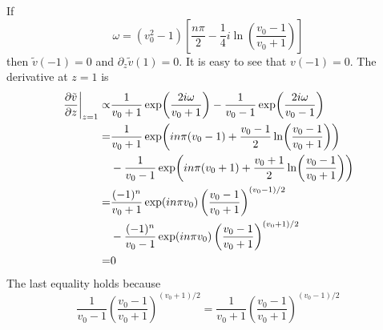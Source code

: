If
\[\omega = (v_0^2-1) \left[ \frac{n\pi}{2} - \frac{1}{4}i\ln\left(\frac{v_0-1}{v_0+1}\right) \right]\]
then $\tilde{v}(-1) = 0$ and $\partial_z\tilde{v}(1) = 0$.
It is easy to see that $v(-1)=0$. The derivative at $z=1$ is
\begin{align*}
    \eval{\pdv{\tilde{v}}{z}}_{z=1} \propto &
    \frac{1}{v_0+1}\exp(\frac{2i\omega}{v_0+1}) - \frac{1}{v_0-1}\exp(\frac{2i\omega}{v_0-1})                                   \\
    =                                       & \frac{1}{v_0+1}\exp(in\pi(v_0-1) + \frac{v_0-1}{2}\ln(\frac{v_0-1}{v_0+1}))       \\
                                            & - \frac{1}{v_0-1}\exp(in\pi(v_0+1) + \frac{v_0+1}{2}\ln(\frac{v_0-1}{v_0+1}))     \\
    =                                       & \frac{(-1)^n}{v_0+1}\exp(in\pi v_0)\left(\frac{v_0-1}{v_0+1}\right)^{(v_0-1)/2}   \\
                                            & - \frac{(-1)^n}{v_0-1}\exp(in\pi v_0)\left(\frac{v_0-1}{v_0+1}\right)^{(v_0+1)/2} \\
    =                                       & 0
\end{align*}
The last equality holds because
\[ \frac{1}{v_0-1}\left(\frac{v_0-1}{v_0+1}\right)^{(v_0+1)/2}
    = \frac{1}{v_0+1}\left(\frac{v_0-1}{v_0+1}\right)^{(v_0-1)/2}  \]